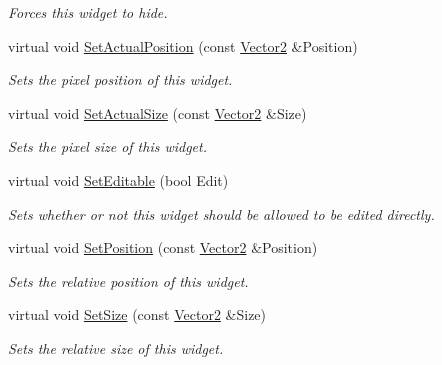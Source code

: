 \begin{DoxyCompactItemize}
\begin{DoxyCompactList}\small\item\em Forces this widget to hide. \item\end{DoxyCompactList}\item 
virtual void \hyperlink{classphys_1_1UI_1_1Spinner_a66bc26a2252cacd71e8c409e35672909}{SetActualPosition} (const \hyperlink{classphys_1_1Vector2}{Vector2} \&Position)
\begin{DoxyCompactList}\small\item\em Sets the pixel position of this widget. \item\end{DoxyCompactList}\item 
virtual void \hyperlink{classphys_1_1UI_1_1Spinner_a564782cd7135a708295c51e722f22716}{SetActualSize} (const \hyperlink{classphys_1_1Vector2}{Vector2} \&Size)
\begin{DoxyCompactList}\small\item\em Sets the pixel size of this widget. \item\end{DoxyCompactList}\item 
virtual void \hyperlink{classphys_1_1UI_1_1Spinner_abc02184e58175e363e2dfc1148ebd4d7}{SetEditable} (bool Edit)
\begin{DoxyCompactList}\small\item\em Sets whether or not this widget should be allowed to be edited directly. \item\end{DoxyCompactList}\item 
virtual void \hyperlink{classphys_1_1UI_1_1Spinner_a7b520a5aa26772bd15e880887d174fa6}{SetPosition} (const \hyperlink{classphys_1_1Vector2}{Vector2} \&Position)
\begin{DoxyCompactList}\small\item\em Sets the relative position of this widget. \item\end{DoxyCompactList}\item 
virtual void \hyperlink{classphys_1_1UI_1_1Spinner_a01641c5ed2b360307f3056f142964bf4}{SetSize} (const \hyperlink{classphys_1_1Vector2}{Vector2} \&Size)
\begin{DoxyCompactList}\small\item\em Sets the relative size of this widget. \item\end{DoxyCompactList}\item 

\end{DoxyCompactItemize}
